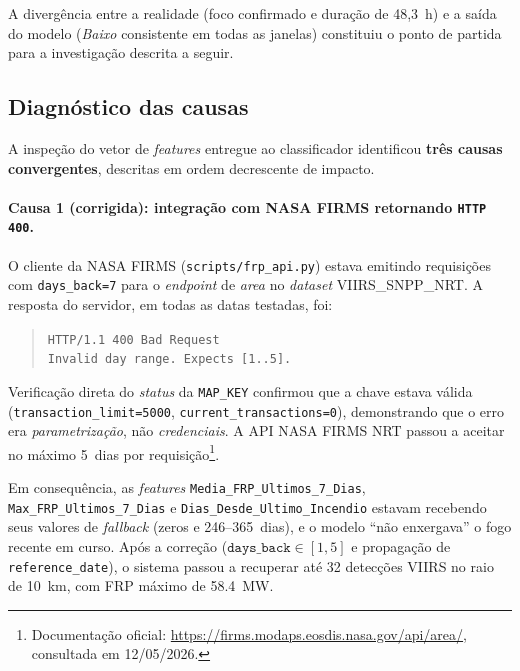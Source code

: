 A divergência entre a realidade (foco confirmado e duração de 48,3~h) e a saída do modelo (\emph{Baixo} consistente em todas as janelas) constituiu o ponto de partida para a investigação descrita a seguir.

\subsection{Diagnóstico das causas}
\label{subsec:pium_diagnostico}

A inspeção do vetor de \emph{features} entregue ao classificador identificou \textbf{três causas convergentes}, descritas em ordem decrescente de impacto.

\paragraph{Causa 1 (corrigida): integração com NASA FIRMS retornando \texttt{HTTP 400}.}

O cliente da NASA FIRMS (\texttt{scripts/frp\_api.py}) estava emitindo requisições com \texttt{days\_back=7} para o \emph{endpoint} de \emph{area} no \emph{dataset} VIIRS\_SNPP\_NRT. A resposta do servidor, em todas as datas testadas, foi:

\begin{quote}
\texttt{HTTP/1.1 400 Bad Request\\Invalid day range. Expects [1..5].}
\end{quote}

Verificação direta do \emph{status} da \texttt{MAP\_KEY} confirmou que a chave estava válida (\texttt{transaction\_limit=5000}, \texttt{current\_transactions=0}), demonstrando que o erro era \emph{parametrização}, não \emph{credenciais}. A API NASA FIRMS NRT passou a aceitar no máximo 5~dias por requisição\footnote{Documentação oficial: \url{https://firms.modaps.eosdis.nasa.gov/api/area/}, consultada em 12/05/2026.}.

Em consequência, as \emph{features} \texttt{Media\_FRP\_Ultimos\_7\_Dias}, \texttt{Max\_FRP\_Ultimos\_7\_Dias} e \texttt{Dias\_Desde\_Ultimo\_Incendio} estavam recebendo seus valores de \emph{fallback} (zeros e 246--365~dias), e o modelo ``não enxergava'' o fogo recente em curso. Após a correção (\(\texttt{days\_back} \in [1,5]\) e propagação de \texttt{reference\_date}), o sistema passou a recuperar até 32 detecções VIIRS no raio de 10~km, com FRP máximo de \SI{58,4}{\mega\watt}.

